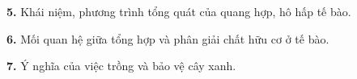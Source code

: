 \documentclass[13pt,a4paper]{article}
\begin{document}
\par\vspace{1pt}\noindent\dotfill\par\vspace{4pt}\noindent\dotfill\par\vspace{4pt}\noindent\dotfill\par\vspace{4pt}\noindent\dotfill\par\vspace{4pt}\noindent\dotfill\par\vspace{4pt}\noindent\dotfill\par\vspace{4pt}\noindent
\textbf{5.} Khái niệm, phương trình tổng quát của quang hợp, hô hấp tế bào.
\par\vspace{1pt}\noindent\dotfill\par\vspace{4pt}\noindent\dotfill\par\vspace{4pt}\noindent\dotfill\par\vspace{4pt}\noindent\dotfill\par\vspace{4pt}\noindent\dotfill\par\vspace{4pt}\noindent\dotfill\par\vspace{4pt}\noindent
\textbf{6.} Mối quan hệ giữa tổng hợp và phân giải chất hữu cơ ở tế bào.
\par\vspace{1pt}\noindent\dotfill\par\vspace{4pt}\noindent\dotfill\par\vspace{4pt}\noindent\dotfill\par\vspace{4pt}\noindent\dotfill\par\vspace{4pt}\noindent\dotfill\par\vspace{4pt}\noindent\dotfill\par\vspace{4pt}\noindent
\textbf{7.} Ý nghĩa của việc trồng và bảo vệ cây xanh.
\par\vspace{1pt}\noindent\dotfill\par\vspace{4pt}\noindent\dotfill\par\vspace{4pt}\noindent\dotfill\par\vspace{4pt}\noindent\dotfill\par\vspace{4pt}\noindent\dotfill\par\vspace{4pt}\noindent\dotfill\par\vspace{4pt}\noindent
\end{document}
